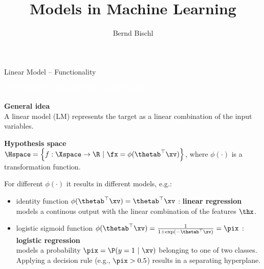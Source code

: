 \documentclass[11pt,compress,t,notes=noshow, xcolor=table]{beamer}
\title{Models in Machine Learning}
\author{Bernd Bischl}
\institute{\href{https://compstat-lmu.github.io/lecture_i2ml/}
{compstat-lmu.github.io/lecture\_i2ml}}
\date{}
\newcommand{\maketag}[1]{\colorbox{highlightcol}{\textcolor{white}
{\MakeUppercase{#1}}}}
\newcommand{\highlight}[1]{\textcolor{highlightcol}{\textbf{#1}}}
\begin{document}










\begin{frame}{Linear Model -- Functionality}

\footnotesize

\maketag{SUPERVISED}
\maketag{PARAMETRIC}
\maketag{WHITE-BOX}


\medskip


\highlight{General idea} ~~  \\
A linear model (LM) represents the target as a linear combination of the input variables.



\medskip

\highlight{Hypothesis space} ~~\\
$\Hspace = \left\{f: \Xspace \to \R ~|~\fx = \phi(\thetab^\top \xv)\right\}$, 
where $\phi(\cdot)$ is a transformation function.

\smallskip

For different $\phi(\cdot)$ it results in different models, e.g.: 
\begin{itemize}
  \item identity function $\phi(\thetab^\top \xv) = \thetab^\top \xv$ :  \textbf{linear regression} \\
  models a continous output with the linear combination of the features $\thx$.
  \item logistic sigmoid function $\phi(\thetab^\top \xv) = \frac{1}{1 + \exp(- \thetab^\top \xv)} = \pix$ : 
  \textbf{logistic regression} \\
  models a probability $\pix = \P(y = 1 ~|~\xv)$ belonging to one of two classes. \\
  Applying a decision rule (e.g., $\pix >0.5$) results in a separating 
  hyperplane.%


\end{itemize}
\end{frame}
\end{document}
